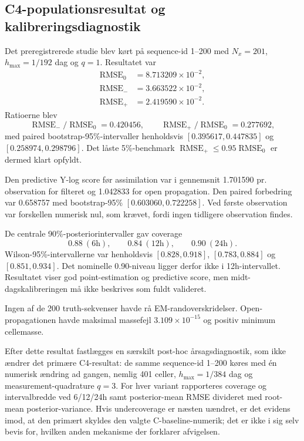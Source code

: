 \subsection{C4-populationsresultat og kalibreringsdiagnostik}
Det preregistrerede studie blev kørt på sequence-id 1--200 med
\(N_x=201\), \(h_{\max}=1/192\) dag og \(q=1\). Resultatet var
\begin{align}
 \operatorname{RMSE}_0 &= 8.713209\times10^{-2},\\
 \operatorname{RMSE}_- &= 3.663522\times10^{-2},\\
 \operatorname{RMSE}_+ &= 2.419590\times10^{-2}.
\end{align}
Ratioerne blev
\[
 \operatorname{RMSE}_-/\operatorname{RMSE}_0=0.420456,\qquad
 \operatorname{RMSE}_+/\operatorname{RMSE}_0=0.277692,
\]
med paired bootstrap-95\%-intervaller henholdsvis
\([0.395617,0.447835]\) og \([0.258974,0.298796]\). Det låste
5\%-benchmark \(\operatorname{RMSE}_+\leq0.95\operatorname{RMSE}_0\)
er dermed klart opfyldt.

Den predictive Y-log score før assimilation var i gennemsnit 1.701590 pr.
observation for filteret og 1.042833 for open propagation. Den paired forbedring
var 0.658757 med bootstrap-95\% \([0.603060,0.722258]\). Ved første observation
var forskellen numerisk nul, som krævet, fordi ingen tidligere observation findes.

De centrale 90\%-posteriorintervaller gav coverage
\[
 0.88\ (6\text{h}),\qquad 0.84\ (12\text{h}),\qquad 0.90\ (24\text{h}).
\]
Wilson-95\%-intervallerne var henholdsvis \([0.828,0.918]\),
\([0.783,0.884]\) og \([0.851,0.934]\). Det nominelle 0.90-niveau ligger derfor
ikke i 12h-intervallet. Resultatet viser god point-estimation og predictive score,
men midt-dagskalibreringen må ikke beskrives som fuldt valideret.

Ingen af de 200 truth-sekvenser havde rå EM-randoverskridelser. Open-propagationen
havde maksimal massefejl \(3.109\times10^{-15}\) og positiv minimum cellemasse.

Efter dette resultat fastlægges en særskilt post-hoc årsagsdiagnostik, som ikke
ændrer det primære C4-resultat: de samme sequence-id 1--200 køres med én numerisk
ændring ad gangen, nemlig 401 celler, \(h_{\max}=1/384\) dag og
measurement-quadrature \(q=3\). For hver variant rapporteres coverage og
intervalbredde ved 6/12/24h samt posterior-mean RMSE divideret med root-mean
posterior-variance. Hvis undercoverage er næsten uændret, er det evidens imod, at
den primært skyldes den valgte C-baseline-numerik; det er ikke i sig selv bevis
for, hvilken anden mekanisme der forklarer afvigelsen.

